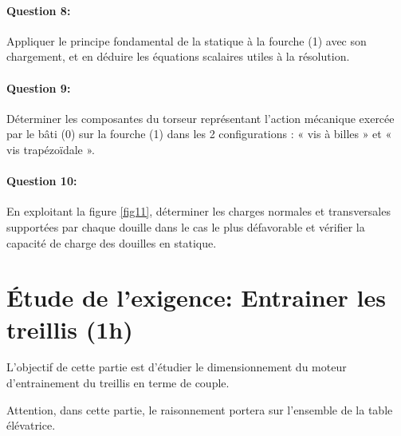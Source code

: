 \paragraph{Question 8:} Appliquer le principe fondamental de la statique à la fourche (1) avec son chargement, et en déduire les équations scalaires utiles à la résolution.

\paragraph{Question 9:} Déterminer les composantes du torseur représentant l'action mécanique exercée par le bâti (0) sur la fourche (1) dans les 2 configurations : « vis à billes » et « vis trapézoïdale ».

\paragraph{Question 10:} En exploitant la figure \ref{fig11}, déterminer les charges normales et transversales supportées par chaque douille dans le cas le plus défavorable et vérifier la capacité de charge des douilles en statique.

\section{Étude de l'exigence: \og Entrainer les treillis \fg (1h)}

L'objectif de cette partie est d'étudier le dimensionnement du moteur d'entrainement du treillis en terme de couple.

Attention, dans cette partie, le raisonnement portera sur l'ensemble de la table élévatrice.

